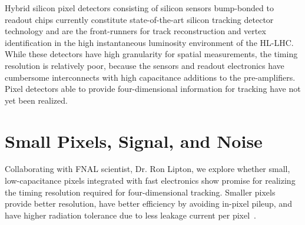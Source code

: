 \begin{refsection}
Hybrid silicon pixel detectors consisting of silicon sensors bump-bonded to readout chips currently constitute state-of-the-art silicon tracking detector technology and are the front-runners for track reconstruction and vertex identification in the high instantaneous luminosity environment of the HL-LHC.
While these detectors have high granularity for spatial measurements, the timing resolution is relatively poor, because the sensors and readout electronics have cumbersome interconnects with high capacitance additions to the pre-amplifiers. 
Pixel detectors able to provide four-dimensional information for tracking have not yet been realized.

\section{Small Pixels, Signal, and Noise}
Collaborating with FNAL scientist, Dr. Ron Lipton, we explore whether small, low-capacitance pixels integrated with fast electronics show promise for realizing the timing resolution required for four-dimensional tracking.
Smaller pixels provide better resolution, have better efficiency by avoiding in-pixel pileup, and have higher radiation tolerance due to less leakage current per pixel~\cite{Garcia-Sciveres_2018}.


\end{refsection}
